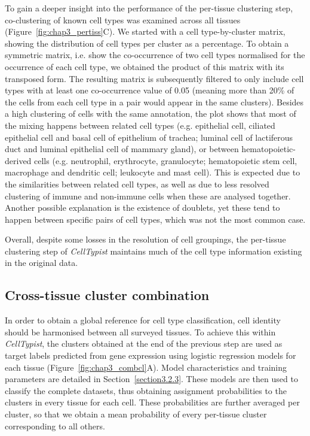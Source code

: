 To gain a deeper insight into the performance of the per-tissue clustering step, co-clustering of known cell types was examined across all tissues (Figure~\ref{fig:chap3_pertiss}C). We started with a cell type-by-cluster matrix, showing the distribution of cell types per cluster as a percentage. To obtain a symmetric matrix, i.e. show the co-occurrence of two cell types normalised for the occurrence of each cell type, we obtained the product of this matrix with its transposed form. The resulting matrix is subsequently filtered to only include cell types with at least one co-occurrence value of 0.05 (meaning more than 20\% of the cells from each cell type in a pair would appear in the same clusters). Besides a high clustering of cells with the same annotation, the plot shows that most of the mixing happens between related cell types (e.g. epithelial cell, ciliated epithelial cell and basal cell of epithelium of trachea; luminal cell of lactiferous duct and luminal epithelial cell of mammary gland), or between hematopoietic-derived cells (e.g. neutrophil, erythrocyte, granulocyte; hematopoietic stem cell, macrophage and dendritic cell; leukocyte and mast cell). This is expected due to the similarities between related cell types, as well as due to less resolved clustering of immune and non-immune cells when these are analysed together. Another possible explanation is the existence of doublets, yet these tend to happen between specific pairs of cell types, which was not the most common case.

Overall, despite some losses in the resolution of cell groupings, the per-tissue clustering step of \textit{CellTypist} maintains much of the cell type information existing in the original data.


\subsection{Cross-tissue cluster combination}
\label{section3.2.2}
In order to obtain a global reference for cell type classification, cell identity should be harmonised between all surveyed tissues. To achieve this within \textit{CellTypist}, the clusters obtained at the end of the previous step are used as target labels predicted from gene expression using logistic regression models for each tissue (Figure~\ref{fig:chap3_combcl}A). Model characteristics and training parameters are detailed in Section~\ref{section3.2.3}. These models are then used to classify the complete datasets, thus obtaining assignment probabilities to the clusters in every tissue for each cell. These probabilities are further averaged per cluster, so that we obtain a mean probability of every per-tissue cluster corresponding to all others.


